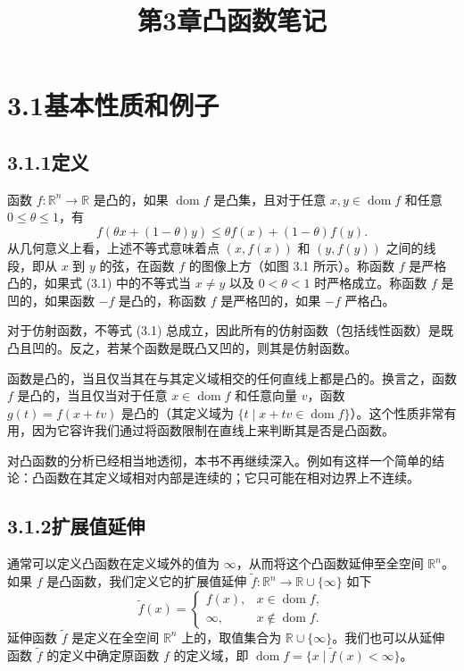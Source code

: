 \documentclass[UTF8,12pt,a4paper,fontset=fandol]{ctexart}
\title{第3章\quad 凸函数笔记}
\author{}
\date{}
\DeclareMathOperator{\dom}{dom}
\begin{document}
\maketitle

\section*{3.1\quad 基本性质和例子}

\subsection*{3.1.1\quad 定义}

函数 $f:\mathbb{R}^n\to\mathbb{R}$ 是凸的，如果 $\dom f$ 是凸集，且对于任意 $x,y\in\dom f$ 和任意 $0\leq\theta\leq 1$，有
\begin{equation}
f(\theta x+(1-\theta)y)\leq \theta f(x)+(1-\theta)f(y).
\tag{3.1}
\end{equation}
从几何意义上看，上述不等式意味着点 $(x,f(x))$ 和 $(y,f(y))$ 之间的线段，即从 $x$ 到 $y$ 的弦，在函数 $f$ 的图像上方（如图 3.1 所示）。称函数 $f$ 是严格凸的，如果式 (3.1) 中的不等式当 $x\neq y$ 以及 $0<\theta<1$ 时严格成立。称函数 $f$ 是凹的，如果函数 $-f$ 是凸的，称函数 $f$ 是严格凹的，如果 $-f$ 严格凸。

对于仿射函数，不等式 (3.1) 总成立，因此所有的仿射函数（包括线性函数）是既凸且凹的。反之，若某个函数是既凸又凹的，则其是仿射函数。

函数是凸的，当且仅当其在与其定义域相交的任何直线上都是凸的。换言之，函数 $f$ 是凸的，当且仅当对于任意 $x\in\dom f$ 和任意向量 $v$，函数 $g(t)=f(x+tv)$ 是凸的（其定义域为 $\{t\mid x+tv\in\dom f\}$）。这个性质非常有用，因为它容许我们通过将函数限制在直线上来判断其是否是凸函数。

对凸函数的分析已经相当地透彻，本书不再继续深入。例如有这样一个简单的结论：凸函数在其定义域相对内部是连续的；它只可能在相对边界上不连续。

\subsection*{3.1.2\quad 扩展值延伸}

通常可以定义凸函数在定义域外的值为 $\infty$，从而将这个凸函数延伸至全空间 $\mathbb{R}^n$。如果 $f$ 是凸函数，我们定义它的扩展值延伸 $\tilde f:\mathbb{R}^n\to\mathbb{R}\cup\{\infty\}$ 如下
\[
\tilde f(x)=
\begin{cases}
f(x), & x\in\dom f,\\
\infty, & x\notin\dom f.
\end{cases}
\]
延伸函数 $\tilde f$ 是定义在全空间 $\mathbb{R}^n$ 上的，取值集合为 $\mathbb{R}\cup\{\infty\}$。我们也可以从延伸函数 $\tilde f$ 的定义中确定原函数 $f$ 的定义域，即 $\dom f=\{x\mid \tilde f(x)<\infty\}$。
\end{document}
